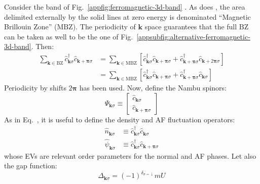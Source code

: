 Consider the band of Fig.~\ref{appfig:ferromagnetic-3d-band} . As does \citeauthor{fabrizio2022course} \cite{fabrizio2022course}, the area delimited externally by the solid lines at zero energy is denominated ``Magnetic Brillouin Zone'' ($\mathrm{MBZ}$). The periodicity of $\mathbf{k}$ space guarantees that the full $\mathrm{BZ}$ can be taken as well to be the one of Fig.~\ref{appsubfig:alternative-ferromagnetic-3d-band}. Then:
\begin{align}
	\sum_{\mathbf{k} \in \mathrm{BZ}}
	\hat c_{\mathbf{k}\sigma}^\dagger \hat c_{\mathbf{k}+\bm{\pi}\sigma} &= \sum_{\mathbf{k} \in \mathrm{MBZ}}
	\left[
		\hat c_{\mathbf{k}\sigma}^\dagger \hat c_{\mathbf{k}+\bm{\pi}\sigma} + \hat c_{\mathbf{k}+\bm{\pi}\sigma}^\dagger \hat c_{\mathbf{k}+2\bm{\pi}\sigma}
	\right] \nonumber \\
	&= \sum_{\mathbf{k} \in \mathrm{MBZ}}
	\left[
		\hat c_{\mathbf{k}\sigma}^\dagger \hat c_{\mathbf{k}+\bm{\pi}\sigma} + \hat c_{\mathbf{k}+\bm{\pi}\sigma}^\dagger \hat c_{\mathbf{k}\sigma}
	\right] \label{appeq:mixed-cc-term-intermediate-passage}
\end{align}
Periodicity by shifts $2\bm{\pi}$ has been used. Now, define the Nambu spinors:
\[
	\hat \Psi_{\mathbf{k}\sigma} \equiv \begin{bmatrix}
		\hat c_{\mathbf{k}\sigma} \\
		\hat c_{\mathbf{k}+\bm{\pi}\sigma} 
	\end{bmatrix}
\]
As in Eq.~\mref, it is useful to define the density and AF fluctuation operators:
\begin{align}
	\hat n_{\mathbf{k}\sigma} &\equiv \hat c_{\mathbf{k}\sigma}^\dagger \hat c_{\mathbf{k}\sigma} \label{appeq:af-hm-n-def} \\
	\hat \psi_{\mathbf{k}\sigma} &\equiv \hat c_{\mathbf{k}\sigma}^\dagger \hat c_{\mathbf{k}+\bm{\pi}\sigma} \label{appeq:af-hm-psi-def}
\end{align}
whose EVs are relevant order parameters for the normal and AF phases. Let also the gap function:
\[
	\Delta_{\mathbf{k}\sigma} = (-1)^{\delta_{\sigma=\downarrow}} mU
\]

